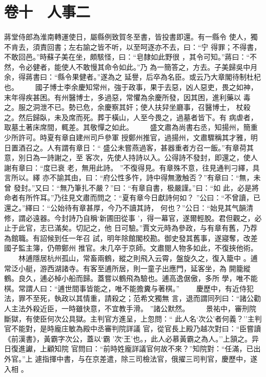 \documentclass{ctexart}
\begin{document}
\section{卷十　人事二}
\paragraph{}
蔣堂侍郎為淮南轉運使日，屬縣例致賀冬至書，皆投書即還。有一縣令 使人，獨不肯去，須責回書；左右諭之皆不听，以至呵逐亦不去，曰：``宁 得罪；不得書，不敢回邑。''時蘇子美在坐，頗駭怪，曰：``皂隸如此野很 ，其令可知。''蔣曰：``不然，令必健者，能使人不敢慢其命令如此。''乃 為一簡答之，方去。子美歸吳中月余，得蔣書曰：``縣令果健者。''遂為之 延譽，后卒為名臣。或云乃大章閣待制杜杞也。 　　國子博士李余慶知常州，強于政事，果于去惡，凶人惡吏，畏之如神， 末年得疾甚困。有州醫博士，多過惡，常懼為余慶所發，因其困，進利藥以 毒之。服之洞泄不已。勢已危，余慶察其奸；使人扶舁坐廳事，召醫博士， 杖殺之。然后歸臥，未及席而死。葬于橫山，人至今畏之，過墓者皆下。有 病虐者，取墓土著床席間，輒差。其敬憚之如此。 　　盛文肅為尚書右丞，知揚州，簡重少所許可。時夏有章自建州司戶參軍 授鄭州推官，過揚州，文肅驟稱其才雅，明日置酒召之。人有謂有章日：`` 盛公未嘗燕過客，甚器重者方召一飯。''有章荷其意，別日為一詩謝之，至 客次，先使人持詩以入。公得詩不發封，即還之，使人謝有章曰：``度已衰 老，無用此詩。 ''不復得見。有章殊不意，往見通判刁繹，具言所以。繹 亦不諭其由，曰：``府公性多忤，詩中得無激触否？''有章曰：``無，未曾 發封。''又曰：``無乃筆扎不嚴？''曰：``有章自書，极嚴謹。''曰：``如 此，必是將命者有所忤耳。''乃往見文肅而問之：``夏有章今日獻詩何如？ ''公曰：``不曾讀，已還之。''繹曰：``公始待有章甚厚，今乃不讀其詩， 何也？''公日：``始見其气韻清修，謂必遠器。今封詩乃自稱`新圃田從事 '，得一幕官，遂爾輕脫。君但觀之，必止于此官，志已滿矣。切記之，他 日可驗。''賈文元時為參政，与有章有舊，乃荐為館職。有詔候到任一年召 試，明年除館閣校勘。御史發其舊事，遂寢奪，改差國子監主簿，仍帶鄭州 推官。未几卒于京師。文肅閱人物多如此，不復挾他術。 　　林逋隱居杭州孤山，常畜兩鶴，縱之則飛入云霄，盤旋久之，復入籠中 。逋常泛小艇，游西湖諸寺。有客至逋所居，則一童子出應門，延客坐，為 開籠縱鶴。良久，逋必棹小船而歸。蓋嘗以鶴飛為驗也。逋高逸倨傲，多所 學，唯不能棋。常謂人曰：``逋世間事皆能之，唯不能擔糞与著棋。'' 　　慶歷中，有近侍犯法，罪不至死，執政以其情重，請殺之；范希文獨無 言，退而謂同列曰：``諸公勸人主法外殺近臣，一時雖快意，不宜教手滑。 ''諸公默然。 　　景祐中，審刑院斷獄，有使臣何次公具獄。主判官方進呈，上忽問：`` 此人名`次公'者何義？''主判官不能對，是時龐庄敏為殿中丞審判院詳議 官，從官長上殿乃越次對曰：``臣嘗讀《前漢書》，黃霸字次公，蓋以`霸 '次`王'也。，此人必慕黃霸之為人。''上頷之。异日復進讞，上顧知院 官問曰：``前時姓龐詳議官何故不來？''知院對：``任滿，已出外官。''上 遽指揮中書，与在京差遣，除三司檢法官，俄擢三司判官，慶歷中，遂入相 。
\clearpage
\end{document}
